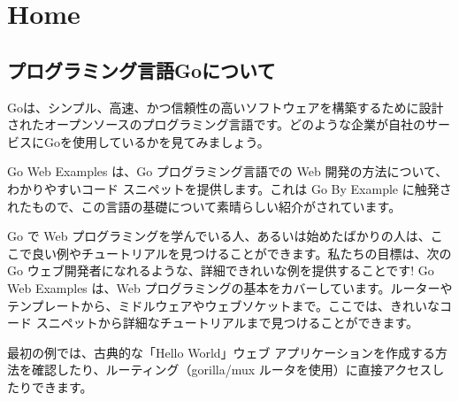 \section{Home}

\subsection{プログラミング言語Goについて}

Goは、シンプル、高速、かつ信頼性の高いソフトウェアを構築するために設計されたオープンソースのプログラミング言語です。どのような企業が自社のサービスにGoを使用しているかを見てみましょう。

Go Web Examples は、Go プログラミング言語での Web 開発の方法について、わかりやすいコード スニペットを提供します。これは Go By Example に触発されたもので、この言語の基礎について素晴らしい紹介がされています。

Go で Web プログラミングを学んでいる人、あるいは始めたばかりの人は、ここで良い例やチュートリアルを見つけることができます。私たちの目標は、次の Go ウェブ開発者になれるような、詳細できれいな例を提供することです! Go Web Examples は、Web プログラミングの基本をカバーしています。ルーターやテンプレートから、ミドルウェアやウェブソケットまで。ここでは、きれいなコード スニペットから詳細なチュートリアルまで見つけることができます。

最初の例では、古典的な「Hello World」ウェブ アプリケーションを作成する方法を確認したり、ルーティング（gorilla/mux ルータを使用）に直接アクセスしたりできます。

